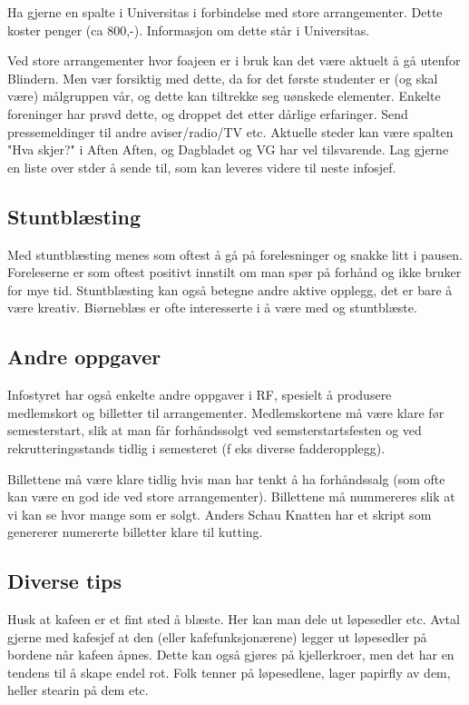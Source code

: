 Ha gjerne en spalte i Universitas i forbindelse med store arrangementer.
Dette koster penger (ca 800,-). Informasjon om dette står i Universitas.

Ved store arrangementer hvor foajeen er i bruk kan det være aktuelt å
gå utenfor Blindern. Men vær forsiktig med dette, da for det første
studenter er (og skal være) målgruppen vår, og dette kan tiltrekke seg
uønskede elementer. Enkelte foreninger har prøvd dette, og droppet det
etter dårlige erfaringer. Send pressemeldinger til andre aviser/radio/TV etc.
Aktuelle steder kan være spalten "Hva skjer?" i Aften Aften, og Dagbladet
og VG har vel tilsvarende. Lag gjerne en liste over stder å sende til,
som kan leveres videre til neste infosjef.


\subsection{Stuntblæsting}
Med stuntblæsting menes som oftest å gå på forelesninger og snakke litt i pausen.
Foreleserne er som oftest positivt innstilt om man spør på forhånd og ikke bruker
for mye tid. Stuntblæsting kan også betegne andre aktive opplegg, det er bare å
være kreativ. Biørneblæs er ofte interesserte i å være med og stuntblæste.


\subsection{Andre oppgaver}
Infostyret har også enkelte andre oppgaver i RF, spesielt å produsere
medlemskort og billetter til arrangementer. Medlemskortene må være klare
før semesterstart, slik at man får forhåndssolgt ved semsterstartsfesten
og ved rekrutteringsstands tidlig i semesteret (f eks diverse fadderopplegg).

Billettene må være klare tidlig hvis man har tenkt å ha forhåndssalg
(som ofte kan være en god ide ved store arrangementer). Billettene må
nummereres slik at vi kan se hvor mange som er solgt. Anders Schau Knatten har et skript som genererer numererte billetter klare til kutting.


\subsection{Diverse tips}
Husk at kafeen er et fint sted å blæste. Her kan man dele ut løpesedler
etc. Avtal gjerne med kafesjef at den (eller kafefunksjonærene) legger ut
løpesedler på bordene når kafeen åpnes. Dette kan også gjøres på
kjellerkroer, men det har en tendens til å skape endel rot. Folk tenner
på løpesedlene, lager papirfly av dem, heller stearin på dem etc.

